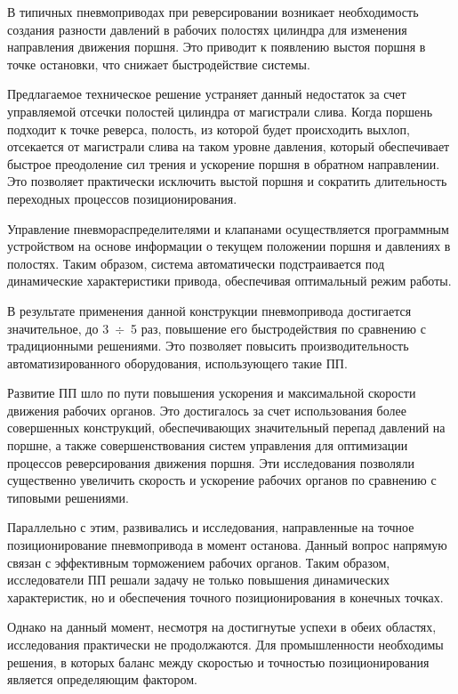 В типичных пневмоприводах при реверсировании возникает необходимость создания разности
давлений в рабочих полостях цилиндра для изменения направления движения поршня.
Это приводит к появлению выстоя поршня в точке остановки, что снижает быстродействие системы.

Предлагаемое техническое решение устраняет данный недостаток за счет управляемой
отсечки полостей цилиндра от магистрали слива. Когда поршень подходит к точке реверса,
полость, из которой будет происходить выхлоп, отсекается от магистрали слива на таком уровне
давления, который обеспечивает быстрое преодоление сил трения и ускорение поршня в обратном
направлении. Это позволяет практически исключить выстой поршня и сократить длительность переходных
процессов позиционирования.

Управление пневмораспределителями и клапанами осуществляется программным устройством
на основе информации о текущем положении поршня и давлениях в полостях. Таким образом,
система автоматически подстраивается под динамические характеристики привода, обеспечивая
оптимальный режим работы.

В результате применения данной конструкции пневмопривода достигается значительное,
до 3~$\div$~5 раз, повышение его быстродействия по сравнению с традиционными решениями.
Это позволяет повысить производительность автоматизированного оборудования, использующего
такие ПП.

Развитие ПП шло по пути повышения ускорения и максимальной скорости движения рабочих органов.
Это достигалось за счет использования более совершенных конструкций, обеспечивающих значительный перепад
давлений на поршне, а также совершенствования систем управления для оптимизации процессов реверсирования
движения поршня. Эти исследования позволяли существенно увеличить скорость и ускорение рабочих органов по
сравнению с типовыми решениями.

Параллельно с этим, развивались и исследования, направленные на точное позиционирование пневмопривода в
момент останова. Данный вопрос напрямую связан с эффективным торможением рабочих органов. Таким образом,
исследователи ПП решали задачу не только повышения динамических характеристик,
но и обеспечения точного позиционирования в конечных точках.

Однако на данный момент, несмотря на достигнутые успехи в обеих областях, исследования
практически не продолжаются. Для промышленности необходимы решения, в которых баланс между
скоростью и точностью позиционирования является определяющим фактором.
